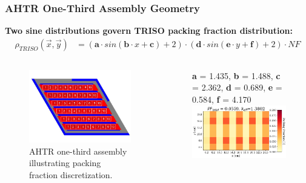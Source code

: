 \begin{frame}
    \frametitle{AHTR One-Third Assembly Geometry}
    \textbf{Two sine distributions govern TRISO packing fraction distribution:}
    \vspace{-0.2cm} 
    \begin{align}
    \rho_{TRISO}(\vec{x}, \vec{y}) &= \left(\textbf{a}\cdot sin(\textbf{b}\cdot 
    x + \textbf{c}) + 2\right) \cdot \left(\textbf{d}\cdot sin(\textbf{e}\cdot y + 
    \textbf{f}) + 2\right) \cdot NF \nonumber
    \end{align}

    \begin{columns}[t]
        \begin{column}{0.5\textwidth}
        \begin{figure}
            \includegraphics[width=\linewidth]{../docs/figures/ahtr_assembly.png} 
            \caption{AHTR one-third assembly illustrating packing fraction discretization.}
        \end{figure}
        \end{column}
        \begin{column}{0.5\textwidth} 
            \begin{figure}
                \textbf{a} = 1.435, \textbf{b} = 1.488, \textbf{c} = 2.362, 
                \textbf{d} = 0.689, \textbf{e} = 0.584, \textbf{f} = 4.170
                \includegraphics[width=\linewidth]{../docs/figures/assem-0.0559-most-minimized.png} 

\end{figure}
\end{column}
\end{columns}
\end{frame}
